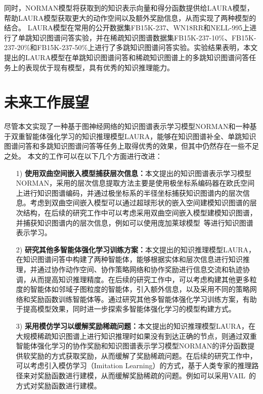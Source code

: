 \documentclass[algorithmlist, AutoFakeBold, AutoFakeSlant, figurelist, tablelist, nomlist, engineering, openany]{seuthesix} %
\begin{document}
\begin{itemize}
  同时，NORMAN模型将获取到的知识表示向量和得分函数提供给LAURA模型，帮助LAURA模型获取更大的动作空间以及额外奖励信息，从而实现了两种模型的结合。
  LAURA模型在常用的公开数据集FB15K-237、WN18RR和NELL-995上进行了单跳知识图谱问答实验，并在稀疏知识图谱数据集FB15K-237-10\%、FB15K-237-20\%和FB15K-237-50\%上进行了多跳知识图谱问答实验。实验结果表明，本文提出的LAURA模型在单跳知识图谱问答和稀疏知识图谱上的多跳知识图谱问答任务上的表现优于现有模型，具有优秀的知识推理能力。
\end{itemize}

\section{未来工作展望}
尽管本文实现了一种基于图神经网络的知识图谱表示学习模型NORMAN和一种基于双重智能体强化学习的知识推理模型LAURA，能够在知识图谱补全、单跳知识图谱问答和多跳知识图谱问答等任务上取得优秀的效果，但其中仍然存在一些不足之处。
本文的工作可以在以下几个方面进行改进：
\begin{itemize}
  \item [1)]\textbf{使用双曲空间嵌入模型捕获层次信息：}本文提出的知识图谱表示学习模型NORMAN，采用的层次信息提取方法主要是使用极坐标系编码器在欧氏空间上进行知识图谱编码，并通过极坐标系的半径坐标捕获知识图谱内的层次信息。考虑到双曲空间嵌入模型可以通过超球形状的嵌入空间建模知识图谱的层次结构，在后续的研究工作中可以考虑采用双曲空间嵌入模型建模知识图谱，并捕获知识图谱内的层次信息，例如可以使用庞加莱球模型~\cite{abramowicz2002poincare}等进行知识图谱表示学习。
  \item [2)]\textbf{研究其他多智能体强化学习训练方案：}本文提出的知识推理模型LAURA，在知识图谱问答中构建了两种智能体，能够根据实体和层次信息进行知识推理，并通过协作动作空间、协作策略网络和协作奖励进行信息交流和轨迹协调，从而提高知识推理精度。在后续的研究工作中，可以考虑构建其他更多粒度的智能体如邻域子图粒度的智能体，引入额外信息，以及采用不同的策略网络和奖励函数训练智能体等。通过研究其他多智能体强化学习训练方案，有助于提高模型效果，同时进一步探索多智能体强化学习的模型构建方式。
  \item [3)]\textbf{采用模仿学习以缓解奖励稀疏问题：}本文提出的知识推理模型LAURA，在大规模稀疏知识图谱上进行知识推理时如果没有到达正确的节点，则通过双重智能体强化学习的协作奖励和知识图谱表示学习模型NORMAN的评分函数提供软奖励的方式获取奖励，从而缓解了奖励稀疏问题。在后续的研究工作中，可以考虑引入模仿学习（Imitation Learning）的方式，基于人类专家的推理路径来对奖励函数进行建模，从而缓解奖励稀疏的问题。例如可以采用VAIL~\cite{pengvariational}的方式对奖励函数进行建模。
\end{itemize}
\end{document}
